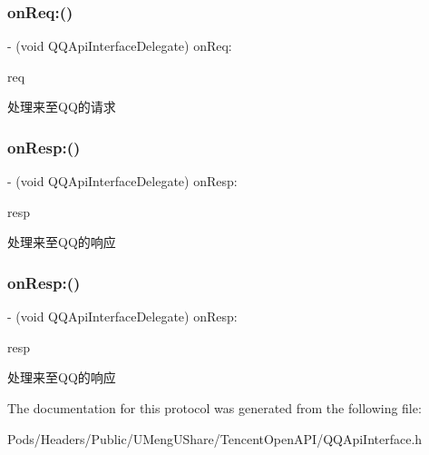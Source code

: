 \subsubsection{\texorpdfstring{on\+Req\+:()}{onReq:()}\hspace{0.1cm}{\footnotesize\ttfamily [2/2]}}
{\footnotesize\ttfamily -\/ (void Q\+Q\+Api\+Interface\+Delegate) on\+Req\+: \begin{DoxyParamCaption}\item[{(\mbox{\hyperlink{interface_q_q_base_req}{Q\+Q\+Base\+Req}} $\ast$)}]{req }\end{DoxyParamCaption}}

处理来至\+Q\+Q的请求 \mbox{\label{protocol_q_q_api_interface_delegate_01-p_a8be1b388f41e1031e1a7a8051ef96315}} 
\subsubsection{\texorpdfstring{on\+Resp\+:()}{onResp:()}\hspace{0.1cm}{\footnotesize\ttfamily [1/2]}}
{\footnotesize\ttfamily -\/ (void Q\+Q\+Api\+Interface\+Delegate) on\+Resp\+: \begin{DoxyParamCaption}\item[{(\mbox{\hyperlink{interface_q_q_base_resp}{Q\+Q\+Base\+Resp}} $\ast$)}]{resp }\end{DoxyParamCaption}}

处理来至\+Q\+Q的响应 \mbox{\label{protocol_q_q_api_interface_delegate_01-p_a8be1b388f41e1031e1a7a8051ef96315}} 
\subsubsection{\texorpdfstring{on\+Resp\+:()}{onResp:()}\hspace{0.1cm}{\footnotesize\ttfamily [2/2]}}
{\footnotesize\ttfamily -\/ (void Q\+Q\+Api\+Interface\+Delegate) on\+Resp\+: \begin{DoxyParamCaption}\item[{(\mbox{\hyperlink{interface_q_q_base_resp}{Q\+Q\+Base\+Resp}} $\ast$)}]{resp }\end{DoxyParamCaption}}

处理来至\+Q\+Q的响应 

The documentation for this protocol was generated from the following file\+:\begin{DoxyCompactItemize}
\item 
Pods/\+Headers/\+Public/\+U\+Meng\+U\+Share/\+Tencent\+Open\+A\+P\+I/Q\+Q\+Api\+Interface.\+h\end{DoxyCompactItemize}
